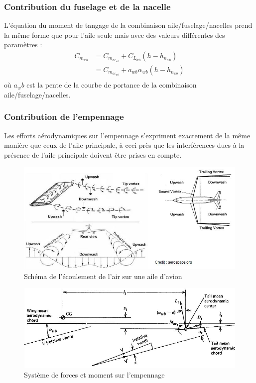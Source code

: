 \documentclass{report}
\begin{document}
\subsubsection{Contribution du fuselage et de la nacelle}

L'équation du moment de tangage de la combinaison aile/fuselage/nacelles prend la même forme que pour l'aile seule mais avec des valeurs différentes des paramètres :
\begin{eqnarray}
C_{m_{wb}} &= C_{m_{ac_{wb}}}+C_{L_{wb}}(h-h_{n_{wb}})\\
&= C_{m_{ac_{wb}}}+a_{wb}\alpha_{wb}(h-h_{n_{wb}})\\
\end{eqnarray}
où $a_wb$ est la pente de la courbe de portance de la combinaison aile/fuselage/nacelles.

\subsubsection{Contribution de l'empennage}

Les efforts aérodynamiques sur l'empennage s'expriment exactement de la même manière que ceux de l'aile principale, à ceci près que les interférences dues à la présence de l'aile principale doivent être prises en compte.

\begin{figure}[h!]
    \centering
    \includegraphics[scale=0.7]{23.JPG}
    \caption{Schéma de l'écoulement de l'air sur une aile d'avion}
    \label{23}
\end{figure}

\begin{figure}[h!]
    \centering
    \includegraphics[scale=0.7]{24.JPG}
    \caption{Système de forces et moment sur l'empennage}
    \label{24}
\end{figure}
\end{document}
